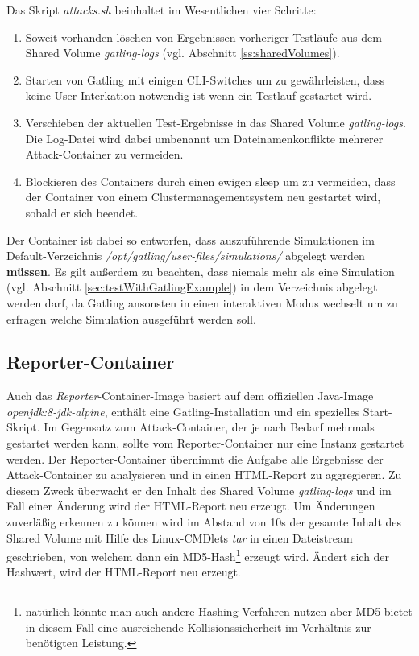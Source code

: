 Das Skript \textit{attacks.sh} beinhaltet im Wesentlichen vier Schritte:

\begin{enumerate}
	\item Soweit vorhanden l\"oschen von Ergebnissen vorheriger Testl\"aufe aus dem Shared Volume \textit{gatling-logs} (vgl. Abschnitt \ref{ss:sharedVolumes}).
	\item Starten von Gatling mit einigen \ac{CLI}-Switches um zu gew\"ahrleisten, dass keine User-Interkation notwendig ist wenn ein Testlauf gestartet wird.
	\item Verschieben der aktuellen Test-Ergebnisse in das Shared Volume \textit{gatling-logs}. Die Log-Datei wird dabei umbenannt um Dateinamenkonflikte mehrerer Attack-Container zu vermeiden.
	\item Blockieren des Containers durch einen ewigen \glqq{}sleep\grqq{} um zu vermeiden, dass der Container von einem Clustermanagementsystem neu gestartet wird, sobald er sich beendet.
\end{enumerate}

Der Container ist dabei so entworfen, dass auszuf\"uhrende Simulationen im Default-Verzeichnis \textit{/opt/gatling/user-files/simulations/} abgelegt werden \textbf{m\"ussen}.
Es gilt au\ss{}erdem zu beachten, dass niemals mehr als eine Simulation (vgl. Abschnitt \ref{sec:testWithGatlingExample}) in dem Verzeichnis abgelegt werden darf, da Gatling ansonsten in einen interaktiven Modus wechselt um zu erfragen welche Simulation ausgef\"uhrt werden soll.

\subsection{Reporter-Container}

Auch das \textit{Reporter}-Container-Image basiert auf dem offiziellen Java-Image \textit{openjdk:8-jdk-alpine}, enth\"alt eine Gatling-Installation und ein spezielles Start-Skript.
Im Gegensatz zum Attack-Container, der je nach Bedarf mehrmals gestartet werden kann, sollte vom Reporter-Container nur eine Instanz gestartet werden.
Der Reporter-Container \"ubernimmt die Aufgabe alle Ergebnisse der Attack-Container zu analysieren und in einen HTML-Report zu aggregieren.
Zu diesem Zweck \"uberwacht er den Inhalt des Shared Volume \textit{gatling-logs} und im Fall einer \"Anderung wird der HTML-Report neu erzeugt.
Um \"Anderungen zuverl\"a\ss{}ig erkennen zu k\"onnen wird im Abstand von 10s der gesamte Inhalt des Shared Volume mit Hilfe des Linux-CMDlets \textit{tar} in einen Dateistream geschrieben, von welchem dann ein MD5-Hash\footnote{nat\"urlich k\"onnte man auch andere Hashing-Verfahren nutzen aber MD5 bietet in diesem Fall eine ausreichende Kollisionssicherheit im Verh\"altnis zur ben\"otigten Leistung.} erzeugt wird.
\"Andert sich der Hashwert, wird der HTML-Report neu erzeugt.

